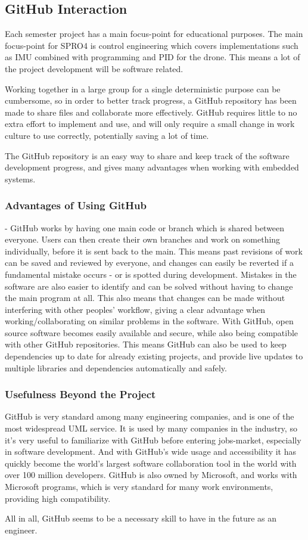 \subsection{GitHub Interaction}
Each semester project has a main focus-point for educational purposes. The main focus-point for SPRO4 is control engineering which covers implementations such as IMU combined with programming and PID for the drone. This means a lot of the project development will be software related.

Working together in a large group for a single deterministic purpose can be cumbersome, so in order to better track progress, a GitHub repository has been made to share files and collaborate more effectively. GitHub requires little to no extra effort to implement and use, and will only require a small change in work culture to use correctly, potentially saving a lot of time.

 The GitHub repository is an easy way to share and keep track of the software development progress, and gives many advantages when working with embedded systems. 

\subsubsection{Advantages of Using GitHub}
- GitHub works by having one main code or branch which is shared between everyone. Users can then create their own branches and work on something individually, before it is sent back to the main. This means past revisions of work can be saved and reviewed by everyone, and changes can easily be reverted if a fundamental mistake occurs - or is spotted during development. Mistakes in the software are also easier to identify and can be solved without having to change the main program at all. This also means that changes can be made without interfering with other peoples' workflow, giving a clear advantage when working/collaborating on similar problems in the software.\cite{benefitsGithub}
With GitHub, open source software becomes easily available and secure, while also being compatible with other GitHub repositories. This means GitHub can also be used to keep dependencies up to date for already existing projects, and provide live updates to multiple libraries and dependencies automatically and safely. \cite{githubaccelerates}

\subsubsection{Usefulness Beyond the Project}
GitHub is very standard among many engineering companies, and is one of the most widespread UML service. It is used by many companies in the industry, so it's very useful to familiarize with GitHub before entering jobs-market, especially in software development.
And with GitHub's wide usage and accessibility it has quickly become the world's largest software collaboration tool in the world with over 100 million developers.\cite{WhoGithub} GitHub is also owned by Microsoft, and works with Microsoft programs, which is very standard for many work environments, providing high compatibility.

All in all, GitHub seems to be a necessary skill to have in the future as an engineer.

